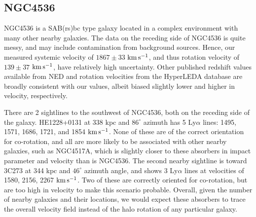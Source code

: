 \documentclass[iop]{emulateapj-rtx4}
\newcommand{\kms}{$\rm km\, s^{-1}$}
\begin{document}
\subsection{NGC4536}
NGC4536 is a SAB(rs)bc type galaxy located in a complex environment with many other nearby galaxies. The data on the receding side of NGC4536 is quite messy, and may include contamination from background sources. Hence, our measured systemic velocity of $1867 \pm 33$ \kms, and thus rotation velocity of $139 \pm 37$ \kms, have relatively high uncertainty. Other published redshift values available from NED and rotation velocities from the HyperLEDA database are broadly consistent with our values, albeit biased slightly lower and higher in velocity, respectively.

There are 2 sightlines to the southwest of NGC4536, both on the receding side of the galaxy. HE1228+0131 at 338 kpc and $86^{\circ}$ azimuth has 5 Ly$\alpha$ lines: 1495, 1571, 1686, 1721, and 1854 \kms. None of these are of the correct orientation for co-rotation, and all are more likely to be associated with other nearby galaxies, such as NGC4517A, which is slightly closer to these absorbers in impact parameter and velocity than is NGC4536. The second nearby sightline is toward 3C273 at 344 kpc and $46^{\circ}$ azimuth angle, and shows 3 Ly$\alpha$ lines at velocities of 1580, 2156, 2267 \kms. Two of these are correctly oriented for co-rotation, but are too high in velocity to make this scenario probable. Overall, given the number of nearby galaxies and their locations, we would expect these absorbers to trace the overall velocity field instead of the halo rotation of any particular galaxy.




\end{document}
